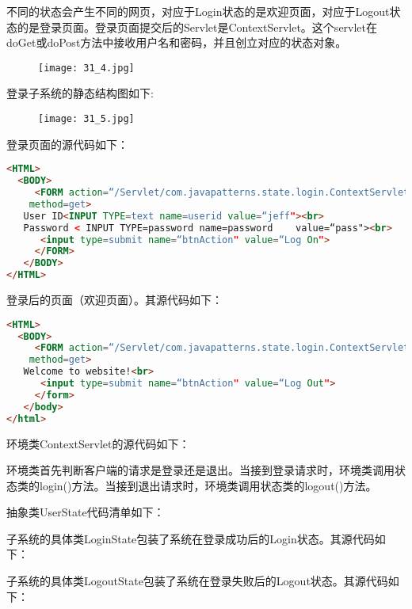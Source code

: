 \documentclass[../main.tex]{subfiles}
\begin{document}
不同的状态会产生不同的网页，对应于Login状态的是欢迎页面，对应于Logout状态的是登录页面。登录页面提交后的Servlet是ContextServlet。这个servlet在doGet或doPost方法中接收用户名和密码，并且创立对应的状态对象。
%
\begin{figure}[H]
  \texttt{[image: 31\_4.jpg]}
\end{figure}
%
登录子系统的静态结构图如下:
%
\begin{figure}[H]
  \texttt{[image: 31\_5.jpg]}
\end{figure}
%
登录页面的源代码如下：
%
\begin{lstlisting}[language=html]
<HTML>
  <BODY>
     <FORM action=“/Servlet/com.javapatterns.state.login.ContextServlet"
    method=get>
   User ID<INPUT TYPE=text name=userid value=“jeff"><br>
   Password < INPUT TYPE=password name=password    value=“pass"><br>
      <input type=submit name=“btnAction" value=“Log On">
     </FORM>
   </BODY>
</HTML>
\end{lstlisting}
%
登录后的页面（欢迎页面）。其源代码如下：
%
\begin{lstlisting}[language=html]
<HTML>
  <BODY>
     <FORM action=“/Servlet/com.javapatterns.state.login.ContextServlet"
    method=get>
   Welcome to website!<br>
      <input type=submit name=“btnAction" value=“Log Out">
     </form>
   </body>
</html>
\end{lstlisting}
%
环境类ContextServlet的源代码如下：
%

%
环境类首先判断客户端的请求是登录还是退出。当接到登录请求时，环境类调用状态类的login()方法。当接到退出请求时，环境类调用状态类的logout()方法。

抽象类UserState代码清单如下：
%

%
子系统的具体类LoginState包装了系统在登录成功后的Login状态。其源代码如下：
%

%
子系统的具体类LogoutState包装了系统在登录失败后的Logout状态。其源代码如下：
%

%
\end{document}
